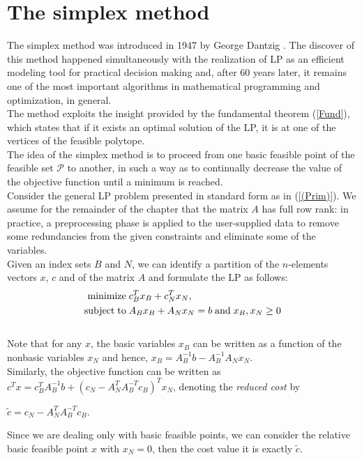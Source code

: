 \documentclass[a4paper,10 pt,titlepage,twoside]{book}
\theoremstyle{plain}
\theoremstyle{definition}
\theoremstyle{remark}
\begin{document}
\chapter{The simplex method}
The simplex method was introduced in 1947 by George Dantzig \cite{DAN1}. The discover of this method happened simultaneously with the realization of LP as an efficient modeling tool for practical decision making and, after 60 years later, it remains one of the most important algorithms in mathematical programming and
optimization, in general.\\
The method exploits the insight provided by the fundamental theorem
(\ref{Fund}), which states that if it exists an optimal solution of the LP, it is at one of the vertices of the feasible polytope. \\
The idea of the simplex method is to proceed from one basic feasible point of the feasible set $\mathcal{P}$ to another, in such a way as to continually decrease the value of the objective
function until a minimum is reached.\\ Consider the general LP problem presented in standard form as in (\ref{(Prim)}).
We assume for the remainder of the chapter that the matrix $A$ has full row rank: in practice, a preprocessing phase is applied to the user-supplied data to remove some
redundancies from the given constraints and eliminate some of the variables.\\Given an index sets $B$ and $N$, we can identify a partition of the $n$-elements vectors $x$, $c$ and of the matrix $A$ and formulate the LP as follows:
\begin{equation}
\begin{split}
\text{minimize\;} &c^{T}_{B}x_{B}+c^{T}_{N}x_{N},\\
\text{subject\;to\;}&A_{B}x_{B}+A_{N}x_{N} = b\text{\;and\;}x_{B}, x_{N}\geq0
\end{split}
\end{equation}
 \\Note that for any $x$, the basic variables $x_{B}$ can be written as a function of the nonbasic variables $x_{N}$ and hence, $x_{B}=A_{B}^{-1}b-A_{B}^{-1}A_{N}x_{N}$. \\Similarly, the objective function can be written as $c^{T}x=c_{B}^{T}A_{B}^{-1}b+(c_{N}-A_{N}^{T}A_{B}^{-T}c_{B})^{T}x_{N}$, denoting the \textit{reduced cost} by \begin{center}
 	$\widetilde{c}=c_{N}-A_{N}^{T}A_{B}^{-T}c_{B}$.
 \end{center}Since we are dealing only with basic feasible points, we can consider the relative basic feasible point $x$ with $x_{N}= 0$, then the cost value it is exactly $\widetilde{c}$.\\
\end{document}
